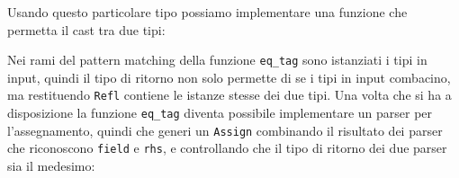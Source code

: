 \documentclass[12pt,a4paper]{report}
\begin{document}
\begin{Shaded}
\begin{Highlighting}[]
\end{Highlighting}
\end{Shaded}

Usando questo particolare tipo possiamo implementare una funzione che
permetta il cast tra due tipi:

\begin{Shaded}
\begin{Highlighting}[]
\NormalTok{ = }
\NormalTok{ | }\NormalTok{, }\NormalTok{ -> }
\NormalTok{ | _,_ -> }
\end{Highlighting}
\end{Shaded}

Nei rami del pattern matching della funzione \texttt{eq\_tag} sono
istanziati i tipi in input, quindi il tipo di ritorno non solo permette
di se i tipi in input combacino, ma restituendo \texttt{Refl} contiene
le istanze stesse dei due tipi. Una volta che si ha a disposizione la
funzione \texttt{eq\_tag} diventa possibile implementare un parser per
l'assegnamento, quindi che generi un \texttt{Assign} combinando il
risultato dei parser che riconoscono \texttt{field} e \texttt{rhs}, e
controllando che il tipo di ritorno dei due parser sia il medesimo:

\begin{Shaded}
\begin{Highlighting}[]
\NormalTok{) }
\NormalTok{ (}
\NormalTok{ | }
\NormalTok{ | }\NormalTok{ -> }
\end{Highlighting}
\end{Shaded}
\end{document}
